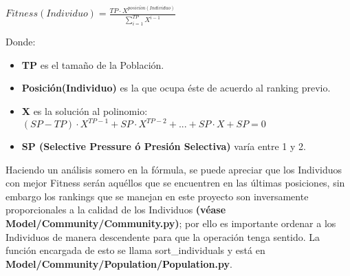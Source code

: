 \documentclass[class=report, crop=false]{standalone}
\begin{document}
\begin{center}\(Fitness(Individuo) = \frac{TP \cdot X^{posici\acute{o}n(Individuo)}}{\sum_{i=1}^{TP}X^{i - 1}}\)
\end{center}

Donde:

\begin{itemize}
\item \textbf{TP} es el tamaño de la Población.
\item \textbf{Posición(Individuo)} es la que ocupa éste de acuerdo al ranking previo.
\item \textbf{X} es la solución al polinomio: \((SP - TP) \cdot X^{TP - 1} + SP \cdot X^{TP - 2} + ... + SP \cdot X + SP = 0\)
\item \textbf{SP (Selective Pressure ó Presión Selectiva)} varía entre 1 y 2.
\end{itemize}

Haciendo un análisis somero en la fórmula, se puede apreciar que los
Individuos con mejor Fitness serán aquéllos que se encuentren en las 
últimas posiciones, sin embargo los rankings que se manejan en este 
proyecto son inversamente proporcionales a la calidad de los Individuos 
\textbf{(véase Model/Community/Community.py)}; por ello es importante 
ordenar a los Individuos de manera descendente para que la operación 
tenga sentido. La función encargada de esto se llama sort\_individuals 
y está en \textbf{Model/Community/}\break\textbf{Population/Population.py}.
\end{document}
